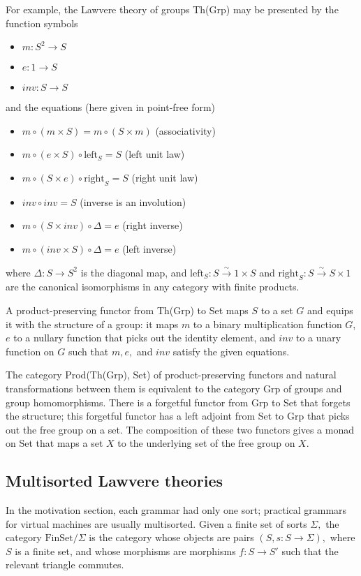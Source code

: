 \documentclass{article}
\newcommand{\maps}{\colon}
\newcommand{\FinSet}{\mathrm{FinSet}}
\begin{document}
For example, the Lawvere theory of groups Th(Grp) may be presented by the function symbols
\begin{itemize}
  \item $m\maps S^2 \to S$
  \item $e\maps 1 \to S$
  \item $inv \maps S \to S$
\end{itemize}
and the equations (here given in point-free form)
\begin{itemize}
  \item $m \circ (m \times S) = m \circ (S \times m)$ (associativity)
  \item $m \circ (e \times S) \circ \mathrm{left}_S = S$ (left unit law)
  \item $m \circ (S \times e) \circ \mathrm{right}_S = S$ (right unit law)
  \item $inv \circ inv = S$ (inverse is an involution)
  \item $m \circ (S \times inv) \circ \Delta = e$ (right inverse)
  \item $m \circ (inv \times S) \circ \Delta = e$ (left inverse)
\end{itemize}
where ${\Delta\maps S \to S^2}$ is the diagonal map, and ${\mathrm{left}_S\maps S \stackrel{\sim}{\to} 1 \times S}$ and ${\mathrm{right}_S\maps S \stackrel{\sim}{\to} S \times 1}$ are the canonical isomorphisms in any category with finite products.

A product-preserving functor from Th(Grp) to Set maps $S$ to a set $G$ and equips it with the structure of a group: it maps $m$ to a binary multiplication function $G$, $e$ to a nullary function that picks out the identity element, and $inv$ to a unary function on $G$ such that $m, e,$ and $inv$ satisfy the given equations.

The category Prod(Th(Grp), Set) of product-preserving functors and natural transformations between them is equivalent to the category Grp of groups and group homomorphisms.  There is a forgetful functor from Grp to Set that forgets the structure; this forgetful functor has a left adjoint from Set to Grp that picks out the free group on a set.  The composition of these two functors gives a monad on Set that maps a set $X$ to the underlying set of the free group on $X.$

\subsection{Multisorted Lawvere theories}
In the motivation section, each grammar had only one sort; practical grammars for virtual machines are usually multisorted.  Given a finite set of sorts $\Sigma,$ the category $\FinSet/\Sigma$ is the category whose objects are pairs $(S, s\maps S\to \Sigma),$ where $S$ is a finite set, and whose morphisms are morphisms $f\maps S \to S'$ such that the relevant triangle commutes.
\end{document}

